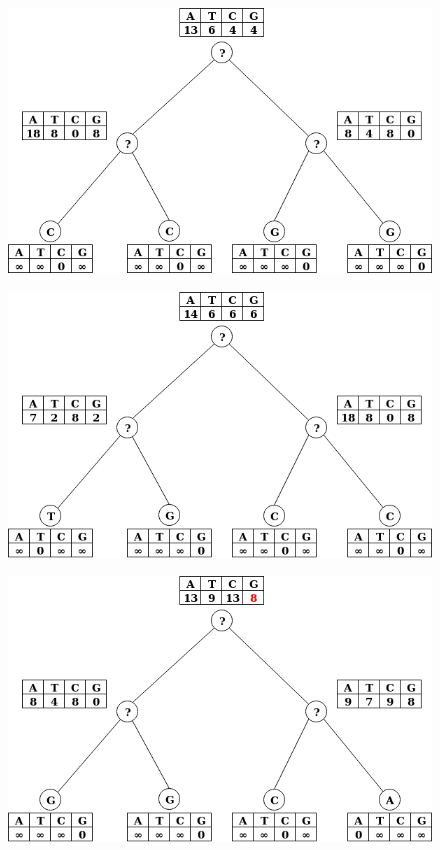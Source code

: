 \documentclass[]{article}
\begin{document}
\begin{figure}[h]
	\includegraphics*[width = \linewidth]{image/tree_3-4.png}
\end{figure}

\begin{figure}[h]
	\includegraphics*[width = \linewidth]{image/tree_5.png}
\end{figure}

\begin{figure}[h]
	\includegraphics*[width = \linewidth]{image/tree_6.png}
\end{figure}
\end{document}
